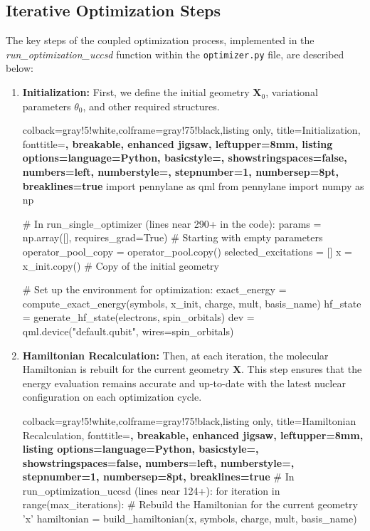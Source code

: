 \subsection{Iterative Optimization Steps}
The key steps of the coupled optimization process, implemented in the \textit{run\_optimization\_uccsd} function within the \texttt{optimizer.py} file, are described below:
\begin{enumerate}
    \item \textbf{Initialization:}
    First, we define the initial geometry \(\mathbf{X}_0\), variational parameters \(\theta_0\), and other required structures.
    \begin{tcblisting}{colback=gray!5!white,colframe=gray!75!black,listing only,
        title=Initialization, fonttitle=\bfseries, breakable, enhanced jigsaw, leftupper=8mm,
        listing options={language=Python, basicstyle=\ttfamily\small,
        showstringspaces=false, numbers=left, numberstyle=\footnotesize,
        stepnumber=1, numbersep=8pt, breaklines=true}}
import pennylane as qml
from pennylane import numpy as np

# In run_single_optimizer (lines near 290+ in the code):
params = np.array([], requires_grad=True)  # Starting with empty parameters
operator_pool_copy = operator_pool.copy()
selected_excitations = []
x = x_init.copy()  # Copy of the initial geometry

# Set up the environment for optimization:
exact_energy = compute_exact_energy(symbols, x_init, charge, mult, basis_name)
hf_state = generate_hf_state(electrons, spin_orbitals)
dev = qml.device("default.qubit", wires=spin_orbitals)
    \end{tcblisting}

    \item \textbf{Hamiltonian Recalculation:}
    Then, at each iteration, the molecular Hamiltonian is rebuilt for the current geometry \(\mathbf{X}\). This step ensures that the energy evaluation remains accurate and up-to-date with the latest nuclear configuration on each optimization cycle.
    \begin{tcblisting}{colback=gray!5!white,colframe=gray!75!black,listing only,
        title=Hamiltonian Recalculation, fonttitle=\bfseries, breakable, enhanced jigsaw, leftupper=8mm,
        listing options={language=Python, basicstyle=\ttfamily\small,
        showstringspaces=false, numbers=left, numberstyle=\footnotesize,
        stepnumber=1, numbersep=8pt, breaklines=true}}
# In run_optimization_uccsd (lines near 124+):
for iteration in range(max_iterations):
    # Rebuild the Hamiltonian for the current geometry 'x'
    hamiltonian = build_hamiltonian(x, symbols, charge, mult, basis_name)
    

\end{tcblisting}
\end{enumerate}
